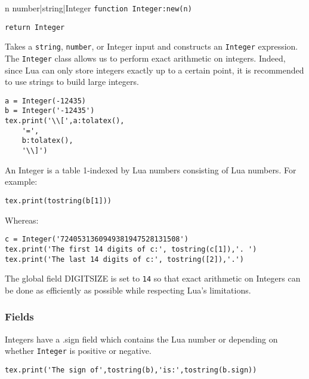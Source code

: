\documentclass{article}
\newcommand{\newcoderef}[3]{%
\begin{newcodehead}[sidebyside,segmentation hidden]{#3}%
    \texttt{#1}%
    \tcblower%
    \begin{flushright}%
    \texttt{#2}%
    \end{flushright}%
\end{newcodehead}%
}
\begin{document}
\newcoderef{function Integer:new(n)}{return Integer}{n number|string|Integer}

Takes a \texttt{string}, \texttt{number}, or {\ttfamily Integer} input and constructs an \texttt{Integer} expression. The \texttt{Integer} class allows us to perform exact arithmetic on integers. Indeed, since Lua can only store integers exactly up to a certain point, it is recommended to use strings to build large integers.

\begin{codebox}
    \begin{verbatim}
a = Integer(-12435)
b = Integer('-12435')
tex.print('\\[',a:tolatex(),
    '=',
    b:tolatex(),
    '\\]')
\end{verbatim}
\tcblower
{}
\end{codebox}
An {\ttfamily Integer} is a table 1-indexed by Lua numbers consisting of Lua numbers. For example:
\begin{codebox}
    \begin{verbatim}
tex.print(tostring(b[1]))
\end{verbatim}
\tcblower
{}
\end{codebox}
Whereas:
\begin{codebox}[]
    \begin{verbatim}
c = Integer('7240531360949381947528131508')
tex.print('The first 14 digits of c:', tostring(c[1]),'. ')
tex.print('The last 14 digits of c:', tostring([2]),'.')
\end{verbatim}
\tcblower
{}
\end{codebox}

The global field {\ttfamily DIGITSIZE} is set to \texttt{14} so that exact arithmetic on {\ttfamily Integer}s can be done as efficiently as possible while respecting Lua's limitations.

\subsubsection*{Fields}
{\ttfamily Integer}s have a {\ttfamily .sign} field which contains the Lua number {} or {} depending on whether \texttt{Integer} is positive or negative.
\begin{codebox}[]
    \begin{verbatim}
tex.print('The sign of',tostring(b),'is:',tostring(b.sign))
\end{verbatim}
\tcblower
{}
\end{codebox}
\end{document}
